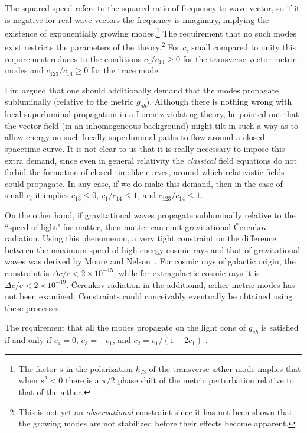 \documentclass[aps]{ws-procs9x6}
\begin{document}
The squared speed refers to the squared ratio of frequency to
wave-vector, so if it is negative for real wave-vectors the
frequency is imaginary, implying the existence of exponentially
growing modes.\footnote{The factor $s$ in the polarization
$h_{I3}$ of the transverse {\ae}ther mode implies that when
$s^2<0$ there is a $\pi/2$ phase shift of the metric perturbation
relative to that of the {\ae}ther.} The requirement that no such
modes exist restricts the parameters of the theory.\footnote{This
is not yet an {\it observational} constraint since it has not
been shown that the growing modes are not stabilized before their
effects become apparent.} For $c_i$ small compared to unity this
requirement reduces to the conditions $c_1/c_{14}\ge0$ for the
transverse vector-metric modes and $c_{123}/c_{14}\ge0$ for the
trace mode.

Lim argued\cite{Lim} that one should additionally demand that the
modes propagate subluminally (relative to the metric $g_{ab}$).
Although there is nothing wrong with local superluminal
propagation in a Lorentz-violating theory, he pointed out that
the vector field (in an inhomogeneous background) might tilt in
such a way as to allow energy on such locally superluminal paths
to flow around a closed spacetime curve. It is not clear to us
that it is really necessary to impose this extra demand, since
even in general relativity the {\it classical} field equations do
not forbid the formation of closed timelike curves, around which
relativistic fields could propagate. In any case, if we do make
this demand, then in the case of small $c_i$ it implies
$c_{13}\le0$, $c_1/c_{14}\le1$, and $c_{123}/c_{14}\le1$.

On the other hand, if gravitational waves propagate subluminally
relative to the ``speed of light" for matter, then matter can
emit gravitational \v{C}erenkov radiation. Using this phenomenon,
a very tight constraint on the difference between the maximum
speed of high energy cosmic rays and that of gravitational waves
was derived by Moore and Nelson~\cite{Moore:2001bv}. For cosmic
rays of galactic origin, the constraint is $\Delta
c/c<2\times10^{-15}$, while for extragalactic cosmic rays it is
$\Delta c/c<2\times10^{-19}$. \v{C}erenkov radiation in the
additional, {\ae}ther-metric modes has not been examined.
Constraints could conceivably eventually be obtained using these
processes.

The requirement that all the modes propagate on the light cone of
$g_{ab}$ is satisfied if and only if $c_4=0$, $c_3=-c_1$, and
$c_2= c_1/(1-2c_1)$ .
\end{document}
